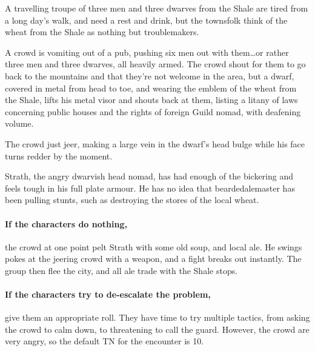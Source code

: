 A travelling troupe of three men and three dwarves from the Shale are tired from a long day's walk, and need a rest and drink, but the townsfolk think of the \gls{wheat} from the Shale as nothing but troublemakers.

\begin{boxtext}

  A crowd is vomiting out of a pub, pushing six men out with them\ldots or rather three men and three dwarves, all heavily armed.
  The crowd shout for them to go back to the mountains and that they're not welcome in the area, but a dwarf, covered in metal from head to toe, and wearing the emblem of the \gls{wheat} from the Shale, lifts his metal visor and shouts back at them, listing a litany of laws concerning public houses and the rights of foreign Guild \gls{nomad}, with deafening volume.

  The crowd just jeer, making a large vein in the dwarf's head bulge while his face turns redder by the moment.

\end{boxtext}

Strath, the angry dwarvish head \gls{nomad}, has had enough of the bickering and feels tough in his full plate armour.
He has no idea that \gls{beardedalemaster} has been pulling stunts, such as destroying the stores of the local \gls{wheat}.

\paragraph{If the characters do nothing,}
the crowd at one point pelt Strath with some old soup, and local ale.
He swings pokes at the jeering crowd with a weapon, and a fight breaks out instantly.
The group then flee the city, and all ale trade with the Shale stops.

\paragraph{If the characters try to de-escalate the problem,}
give them an appropriate roll.
They have time to try multiple tactics, from asking the crowd to calm down, to threatening to call the guard.
However, the crowd are very angry, so the default TN for the encounter is 10.



